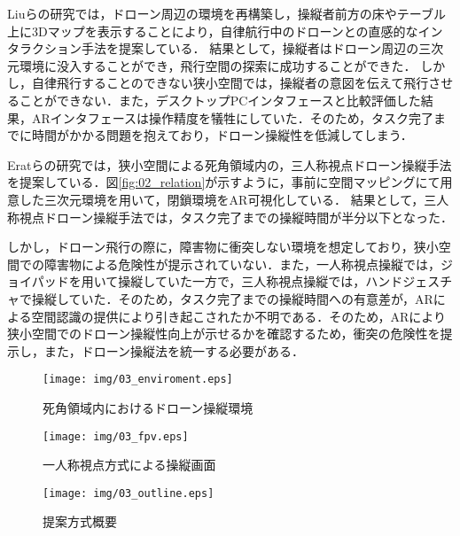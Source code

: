\documentclass[submit]{ipsj}
\begin{document}
Liuらの研究\cite{Liu}では，ドローン周辺の環境を再構築し，操縦者前方の床やテーブル上に3Dマップを表示することにより，自律航行中のドローンとの直感的なインタラクション手法を提案している．
結果として，操縦者はドローン周辺の三次元環境に没入することができ，飛行空間の探索に成功することができた．
しかし，自律飛行することのできない狭小空間では，操縦者の意図を伝えて飛行させることができない．また，デスクトップPCインタフェースと比較評価した結果，ARインタフェースは操作精度を犠牲にしていた．そのため，タスク完了までに時間がかかる問題を抱えており，ドローン操縦性を低減してしまう．

Eratらの研究\cite{Erat}では，狭小空間による死角領域内の，三人称視点ドローン操縦手法を提案している．図\ref{fig:02_relation}が示すように，事前に空間マッピングにて用意した三次元環境を用いて，閉鎖環境をAR可視化している．
結果として，三人称視点ドローン操縦手法では，タスク完了までの操縦時間が半分以下となった．

しかし，ドローン飛行の際に，障害物に衝突しない環境を想定しており，狭小空間での障害物による危険性が提示されていない．また，一人称視点操縦では，ジョイパッドを用いて操縦していた一方で，三人称視点操縦では，ハンドジェスチャで操縦していた．そのため，タスク完了までの操縦時間への有意差が，ARによる空間認識の提供により引き起こされたか不明である．そのため，ARにより狭小空間でのドローン操縦性向上が示せるかを確認するため，衝突の危険性を提示し，また，ドローン操縦法を統一する必要がある．


\begin{figure}[tb]
  \centering
  \texttt{[image: img/03\_enviroment.eps]}
  \caption{死角領域内におけるドローン操縦環境}
  \label{fig:03_enviroment}
  \end{figure}
  
  \begin{figure}[tb]
    \centering
    \texttt{[image: img/03\_fpv.eps]}
    \caption{一人称視点方式による操縦画面}
    \label{fig:03_FPV}
  \end{figure}
  
  \begin{figure}[tb]
  \centering
  \texttt{[image: img/03\_outline.eps]}
  \caption{提案方式概要}
  \label{fig:03_outline}
  \end{figure}
  
\end{document}
